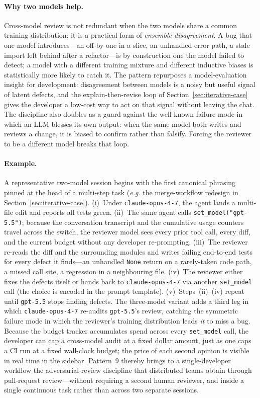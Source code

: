 \documentclass{article}
\newcommand{\eg}{\textit{e.g.}}
\begin{document}
\paragraph{Why two models help.}
Cross-model review is not redundant when the two models share a
common training distribution: it is a practical form of \emph{ensemble
disagreement}.
A bug that one model introduces---an off-by-one in a slice, an unhandled
error path, a stale import left behind after a refactor---is by
construction one the model failed to detect; a model with a different
training mixture and different inductive biases is statistically more
likely to catch it.
The pattern repurposes a model-evaluation insight for development:
disagreement between models is a noisy but useful signal of latent
defects, and the explain-then-revise loop of
Section~\ref{sec:iterative-case} gives the developer a low-cost way to
act on that signal without leaving the chat.
The discipline also doubles as a guard against the well-known failure
mode in which an LLM blesses its own output: when the same model both
writes and reviews a change, it is biased to confirm rather than
falsify.
Forcing the reviewer to be a different model breaks that loop.

\paragraph{Example.}
A representative two-model session begins with the first canonical
phrasing pinned at the head of a multi-step task (\eg{} the
merge-workflow redesign in Section~\ref{sec:iterative-case}).
(i)~Under \texttt{claude-opus-4-7}, the agent lands a multi-file edit
and reports all tests green.
(ii)~The same agent calls \texttt{set\_model("gpt-5.5")}; because the
conversation transcript and the cumulative usage counters travel
across the switch, the reviewer model sees every prior tool call,
every diff, and the current budget without any developer
re-prompting.
(iii)~The reviewer re-reads the diff and the surrounding modules and
writes failing end-to-end tests for every defect it finds---an
unhandled \texttt{None} return on a rarely-taken code path, a missed
call site, a regression in a neighbouring file.
(iv)~The reviewer either fixes the defects itself or hands back to
\texttt{claude-opus-4-7} via another \texttt{set\_model} call (the
choice is encoded in the prompt template).
(v)~Steps~(ii)--(iv) repeat until \texttt{gpt-5.5} stops finding
defects.
The three-model variant adds a third leg in which
\texttt{claude-opus-4-7} re-audits \texttt{gpt-5.5}'s review,
catching the symmetric failure mode in which the reviewer's training
distribution leads \emph{it} to miss a bug.
Because the budget tracker accumulates spend across every
\texttt{set\_model} call, the developer can cap a cross-model audit
at a fixed dollar amount, just as one caps a CI run at a fixed
wall-clock budget; the price of each second opinion is visible in
real time in the sidebar.
Pattern~9 thereby brings to a single-developer workflow the
adversarial-review discipline that distributed teams obtain through
pull-request review---without requiring a second human reviewer, and
inside a single continuous task rather than across two separate
sessions.
\end{document}
